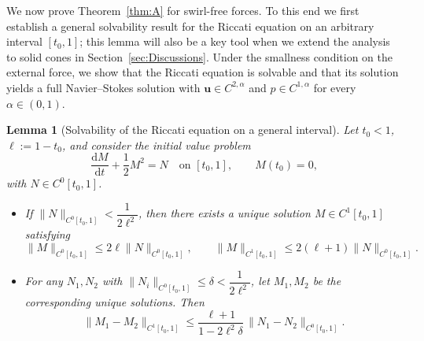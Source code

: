 \documentclass{amsart}
\newtheorem{lemma}[theorem]{Lemma}
\newcommand{\Bu}{{\boldsymbol{u}}}
\begin{document}
We now prove Theorem~\ref{thm:A} for swirl-free forces.
To this end we first establish a general solvability result for the Riccati equation on an arbitrary interval $[t_0,1]$; this lemma will also be a key tool when we extend the analysis to solid cones in Section~\ref{sec:Discussions}.
Under the smallness condition on the external force, we show that the Riccati equation is solvable and that its solution yields a full Navier--Stokes solution with $\Bu\in C^{2,\alpha}$ and $p\in C^{1,\alpha}$ for every $\alpha\in (0,1)$.

\begin{lemma}[Solvability of the Riccati equation on a general interval]\label{lm:Riccati}
Let $t_0<1$, $\ell:=1-t_0$, and consider the initial value problem
\[
\frac{\mathrm{d}M}{\mathrm{d}t} + \frac12 M^{2} = N \quad \text{on } [t_0,1],\qquad M(t_0)=0,
\]
with $N\in C^{0}[t_0,1]$.
\begin{itemize}
\item[(i)] If $\|N\|_{C^{0}[t_0,1]} < \dfrac{1}{2\ell^{2}}$, then there exists a unique solution $M\in C^{1}[t_0,1]$ satisfying
\[
\|M\|_{C^{0}[t_0,1]} \le 2\ell\|N\|_{C^{0}[t_0,1]},\qquad
\|M\|_{C^{1}[t_0,1]} \le 2(\ell+1)\|N\|_{C^{0}[t_0,1]}.
\]
\item[(ii)] For any $N_{1},N_{2}$ with $\|N_{i}\|_{C^{0}[t_0,1]} \le \delta < \dfrac{1}{2\ell^{2}}$, let $M_{1},M_{2}$ be the corresponding unique solutions. Then
\[
\|M_{1}-M_{2}\|_{C^{1}[t_0,1]} \le \frac{\ell+1}{1-2\ell^{2}\delta}\,\|N_{1}-N_{2}\|_{C^{0}[t_0,1]}.
\]
\end{itemize}
\end{lemma}
\end{document}
